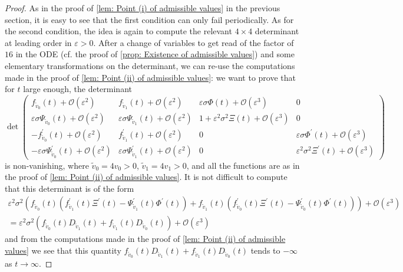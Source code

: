 \documentclass{article}
\numberwithin{equation}{section}        %
\theoremstyle{bfnote}
\theoremstyle{definition}
\theoremstyle{bfremark}
\begin{document}
\begin{proof}
    As in the proof of \cref{lem: Point (i) of admissible values} in the previous section, it is easy to see that the first condition can only fail periodically. As for the second condition, the idea is again to compute the relevant $4 \times 4$ determinant at leading order in $\varepsilon > 0$. After a change of variables to get read of the factor of $16$ in the ODE (cf. the proof of \cref{prop: Existence of admissible values}) and some elementary transformations on the determinant, we can re-use the computations made in the proof of \cref{lem: Point (ii) of admissible values}: we want to prove that for $t$ large enough, the determinant
    \begin{equation*}
        \det 
        \begin{pmatrix}
            f_{\tilde{v}_0}(t) + \mathcal{O}(\varepsilon^2) & f_{\tilde{v}_1}(t) + \mathcal{O}(\varepsilon^2) & \varepsilon \sigma \Phi(t) + \mathcal{O}(\varepsilon^3) & 0 \\ 
            \varepsilon \sigma \Psi_{\tilde{v}_0}(t) + \mathcal{O}(\varepsilon^2) &  \varepsilon \sigma \Psi_{\tilde{v}_1}(t) + \mathcal{O}(\varepsilon^2) & 1 +\varepsilon^2 \sigma^2 \Xi(t) + \mathcal{O}(\varepsilon^3) & 0\\
            - f_{\tilde{v}_0}^\prime(t) + \mathcal{O}(\varepsilon^2) & f_{\tilde{v}_1}^\prime(t) + \mathcal{O}(\varepsilon^2) & 0 & \varepsilon \sigma \Phi^\prime(t) + \mathcal{O}(\varepsilon^3) \\ 
            - \varepsilon \sigma \Psi_{\tilde{v}_0}^\prime(t) + \mathcal{O}(\varepsilon^2) & \varepsilon \sigma \Psi_{\tilde{v}_1}^\prime(t) + \mathcal{O}(\varepsilon^2) & 0 & \varepsilon^2 \sigma^2 \Xi^\prime(t) + \mathcal{O}(\varepsilon^3)
        \end{pmatrix}
    \end{equation*}
    is non-vanishing, where $\tilde{v}_0 = 4v_0 > 0$, $\tilde{v}_1 = 4v_1 > 0$, and all the functions are as in the proof of \cref{lem: Point (ii) of admissible values}. It is not difficult to compute that this determinant is of the form
    \begin{multline*}
        \varepsilon^2\sigma^2 (f_{\tilde{v}_0}(t) (f^\prime_{\tilde{v}_1}(t)\Xi^\prime(t) - \Psi_{\tilde{v}_1}^\prime(t)\Phi^\prime(t)) + f_{\tilde{v}_1}(t) (f^\prime_{\tilde{v}_0}(t)\Xi^\prime(t) - \Psi_{\tilde{v}_0}^\prime(t)\Phi^\prime(t))) + \mathcal{O}(\varepsilon^3) \\ 
            = \varepsilon^2\sigma^2 (f_{\tilde{v}_0}(t) D_{\tilde{v}_1}(t) + f_{\tilde{v}_1}(t) D_{\tilde{v}_0}(t)) + \mathcal{O}(\varepsilon^3)
    \end{multline*}
    and from the computations made in the proof of \cref{lem: Point (ii) of admissible values} we see that this quantity $f_{\tilde{v}_0}(t) D_{\tilde{v}_1}(t) + f_{\tilde{v}_1}(t) D_{\tilde{v}_0}(t)$ tends to $-\infty$ as $t \to \infty$. 
\end{proof}
\end{document}
